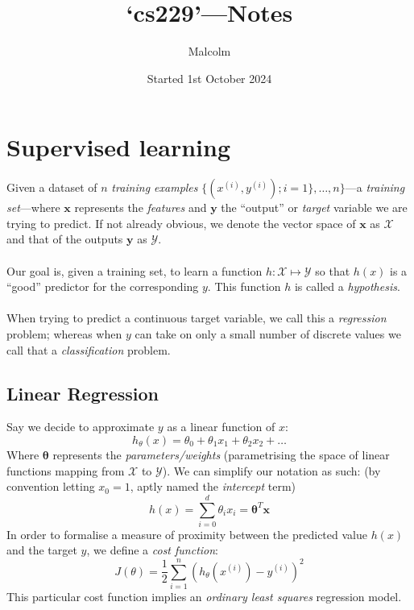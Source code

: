 \documentclass{report}
\title{`cs229'---Notes}
\date{Started 1st October 2024}
\author{Malcolm}
\begin{document}
\maketitle
\tableofcontents

\chapter{Supervised learning}
Given a dataset of $n$ \textit{training examples} $\{(x^{(i)},y^{(i)});i=1\},\ldots,n\}$---a \textit{training set}---where $\bm{x}$ 
represents the \textit{features} and $\bm{y}$ the ``output'' or \textit{target} variable we are trying to predict.
If not already obvious, we denote the vector space of $\bm{x}$ as $\mathcal{X}$ and that of the outputs $\bm{y}$ as 
$\mathcal{Y}$.\\
\vspace{1mm}\\
Our goal is, given a training set, to learn a function $h:\mathcal{X}\mapsto\mathcal{Y}$ so that $h(x)$ is a 
``good'' predictor for the corresponding $y$. This function $h$ is called a \textit{hypothesis}.\\
\vspace{1mm}\\
When trying to predict a continuous target variable, we call this a \textit{regression} problem; whereas when $y$
can take on only a small number of discrete values we call that a \textit{classification} problem.

\section{Linear Regression}
Say we decide to approximate $y$ as a linear function of $x$:
\begin{equation*}
h_\theta(x)=\theta_0+\theta_1x_1+\theta_2x_2+\ldots
\end{equation*}
Where $\bm{\theta}$ represents the \textit{parameters/weights} (parametrising the
space of linear functions mapping from $\mathcal{X}$ to $\mathcal{Y}$).
We can simplify our notation as such: (by convention letting $x_0=1$, aptly named the \textit{intercept} term)
\begin{equation*}
h(x)=\sum^d_{i=0}\theta_ix_i=\bm{\theta}^T\bm{x}
\end{equation*}
In order to formalise a measure of proximity between the predicted value $h(x)$ and the target $y$,
we define a \textit{cost function}:
\begin{equation*}
J(\theta)=\frac{1}{2}\sum^n_{i=1}(h_\theta(x^{(i)})-y^{(i)})^2
\end{equation*}
This particular cost function implies an \textit{ordinary least squares} regression model.
\newpage
\end{document}
